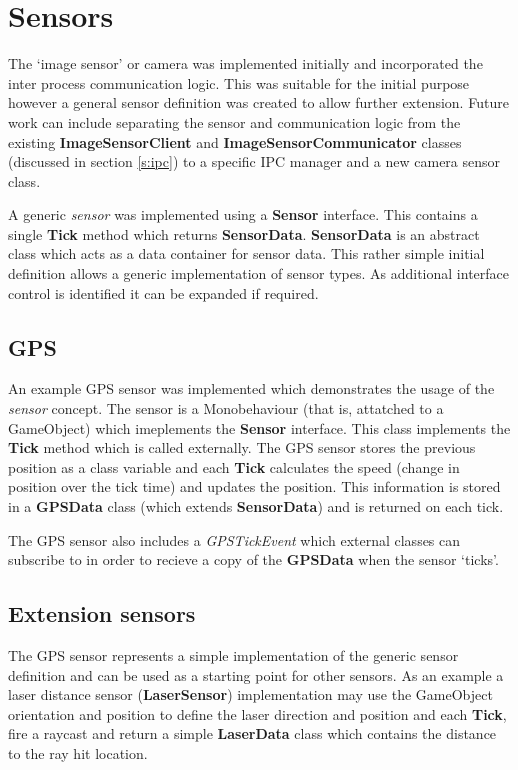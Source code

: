 \documentclass{article}
\begin{document}
\section{Sensors} \label{s:sensors}

The `image sensor' or camera was implemented initially and incorporated the inter process communication logic. This was suitable for the initial purpose however a general sensor definition was created to allow further extension. Future work can include separating the sensor and communication logic from the existing \textbf{ImageSensorClient} and \textbf{ImageSensorCommunicator} classes (discussed in section \ref{s:ipc}) to a specific IPC manager and a new camera sensor class.

A generic \textit{sensor} was implemented using a \textbf{Sensor} interface. This contains a single \textbf{Tick} method which returns \textbf{SensorData}. \textbf{SensorData} is an abstract class which acts as a data container for sensor data. This rather simple initial definition allows a generic implementation of sensor types. As additional interface control is identified it can be expanded if required. 

\subsection{GPS}

An example GPS sensor was implemented which demonstrates the usage of the \textit{sensor} concept. The sensor is a Monobehaviour (that is, attatched to a GameObject) which imeplements the \textbf{Sensor} interface. This class implements the \textbf{Tick} method which is called externally. The GPS sensor stores the previous position as a class variable and each \textbf{Tick} calculates the speed (change in position over the tick time) and updates the position. This information is stored in a \textbf{GPSData} class (which extends \textbf{SensorData}) and is returned on each tick.

The GPS sensor also includes a \textit{GPSTickEvent} which external classes can subscribe to in order to recieve a copy of the \textbf{GPSData} when the sensor `ticks'.

\subsection{Extension sensors}

The GPS sensor represents a simple implementation of the generic sensor definition and can be used as a starting point for other sensors. As an example a laser distance sensor (\textbf{LaserSensor}) implementation may use the GameObject orientation and position to define the laser direction and position and each \textbf{Tick}, fire a raycast and return a simple \textbf{LaserData} class which contains the distance to the ray hit location.
\end{document}

